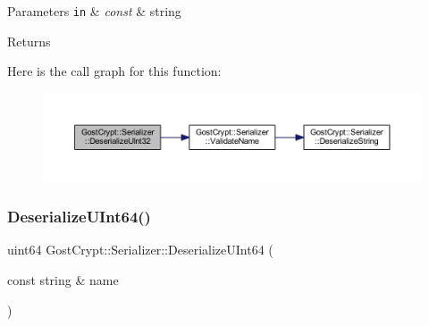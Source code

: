\begin{DoxyParams}[1]{Parameters}
\mbox{\tt in}  & {\em const} & string \\
\hline
\end{DoxyParams}
\begin{DoxyReturn}{Returns}

\end{DoxyReturn}
Here is the call graph for this function\+:
\nopagebreak
\begin{figure}[H]
\begin{center}
\leavevmode
\includegraphics[width=350pt]{class_gost_crypt_1_1_serializer_ac030398e0f4887da331e91cdcf2e2b67_cgraph}
\end{center}
\end{figure}
\mbox{\label{class_gost_crypt_1_1_serializer_aa4bc43dbf0915ddc8ca806893f2fe75c}} 
\subsubsection{\texorpdfstring{Deserialize\+U\+Int64()}{DeserializeUInt64()}}
{\footnotesize\ttfamily uint64 Gost\+Crypt\+::\+Serializer\+::\+Deserialize\+U\+Int64 (\begin{DoxyParamCaption}\item[{const string \&}]{name }\end{DoxyParamCaption})}


